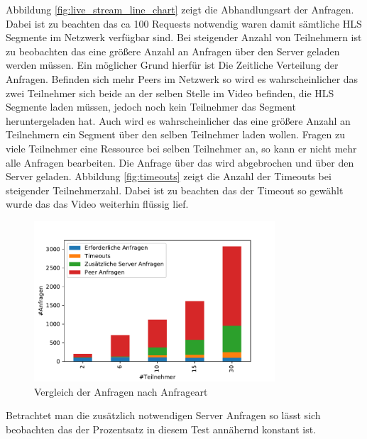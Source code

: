 Abbildung \ref{fig:live_stream_line_chart} zeigt die Abhandlungsart der Anfragen. Dabei ist zu beachten das ca 100 Requests notwendig waren damit sämtliche HLS Segmente im \pTp Netzwerk verfügbar sind. Bei steigender Anzahl von Teilnehmern ist zu beobachten das eine größere Anzahl an Anfragen über den Server geladen werden müssen. Ein möglicher Grund hierfür ist Die Zeitliche Verteilung der Anfragen. Befinden sich mehr Peers im Netzwerk so wird es wahrscheinlicher das zwei Teilnehmer sich beide an der selben Stelle im Video befinden, die HLS Segmente laden müssen, jedoch noch kein Teilnehmer das Segment heruntergeladen hat. Auch wird es wahrscheinlicher das eine größere Anzahl an Teilnehmern ein Segment über den selben Teilnehmer laden wollen. Fragen zu viele Teilnehmer eine Ressource bei selben Teilnehmer an, so kann er nicht mehr alle Anfragen bearbeiten. Die Anfrage über das \pTp \cdn wird abgebrochen und über den Server geladen. Abbildung \ref{fig:timeouts} zeigt die Anzahl der Timeouts bei steigender Teilnehmerzahl. Dabei ist zu beachten das der Timeout so gewählt wurde das das Video weiterhin flüssig lief.


\begin{figure}[!h]
	\centering
	\includegraphics[width=0.8\textwidth]{figures/anfragen_verteilung_bar}
	\caption[A Figure Short-Title]{Vergleich der Anfragen nach Anfrageart}
	\label{fig:anfragen_verteilung_bar}
\end{figure}


Betrachtet man die zusätzlich notwendigen Server Anfragen so lässt sich beobachten das der Prozentsatz in diesem Test annähernd konstant ist.  


